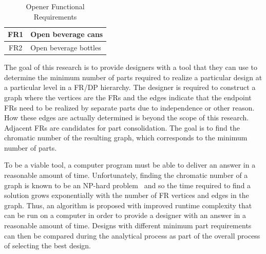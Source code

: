 \begin{table}[H]
  \label{tab:opener}
  \caption{Opener Functional Requirements}
  \begin{center}
    \begin{tabular}{|c|l|}
      \hline
      FR1 & Open beverage cans \\
      \hline
      FR2 & Open beverage bottles \\
      \hline
    \end{tabular}
  \end{center}
\end{table}

The goal of this research is to provide designers with a tool that they can use to determine the minimum number of
parts required to realize a particular design at a particular level in a FR/DP hierarchy.  The designer is required
to construct a graph where the vertices are the FRs and the edges indicate that the endpoint FRs need to be
realized by separate parts due to independence or other reason.  How these edges are actually determined is beyond
the scope of this research.  Adjacent FRs are candidates for part consolidation.  The goal is to find the chromatic
number of the resulting graph, which corresponds to the minimum number of parts.

To be a viable tool, a computer program must be able to deliver an answer in a reasonable amount of time.
Unfortunately, finding the chromatic number of a graph is known to be an NP-hard problem~\cite{mcdiarmid} and so
the time required to find a solution grows exponentially with the number of FR vertices and edges in the graph.
Thus, an algorithm is proposed with improved runtime complexity that can be run on a computer in order to provide a
designer with an answer in a reasonable amount of time.  Designs with different minimum part requirements can then
be compared during the analytical process as part of the overall process of selecting the best design.
